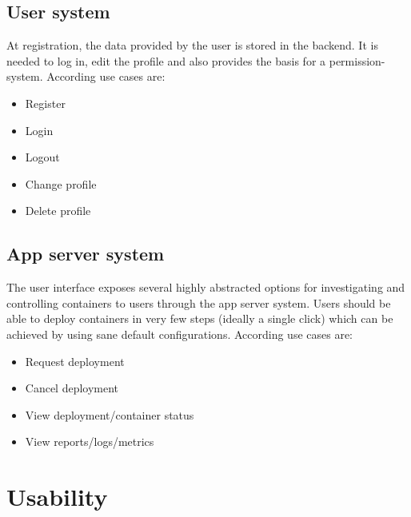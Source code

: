 \documentclass[a4paper,12pt,chapterprefix=false,bibliography=totoc,listof=totoc,]{scrreprt}
\begin{document}
\subsection{{\color{magenta} User system}}
{\color{magenta}
At registration, the data provided by the user is stored in the backend. It is needed to log in, edit the profile and also provides the basis for a permission-system. According use cases are:

\begin{itemize}
    \item Register
    \item Login
    \item Logout
    \item Change profile
    \item Delete profile
\end{itemize}
}

\subsection{{\color{magenta} App server system}}
{\color{magenta}
The user interface exposes several highly abstracted options for investigating and controlling containers to users through the app server system. Users should be able to deploy containers in very few steps (ideally a single click) which can be achieved by using sane default configurations. According use cases are:

\begin{itemize}
    \item Request deployment
    \item Cancel deployment
    \item View deployment/container status
    \item View reports/logs/metrics
\end{itemize}
}

\section{{\color{magenta} Usability}}
\end{document}
